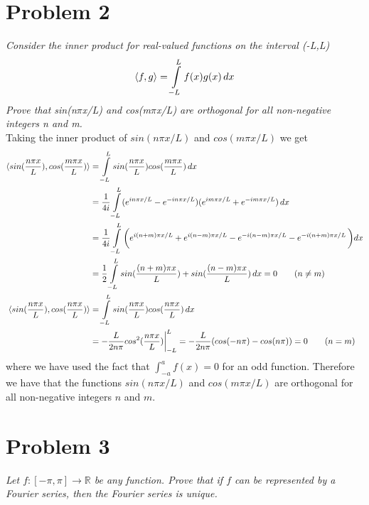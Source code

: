 \documentclass[12pt]{article}
\newcommand{\R}{\mathbb{R}}
\theoremstyle{remark}
\begin{document}
\newpage

\section*{Problem 2}

\textit{Consider the inner product for real-valued functions on the interval (-L,L)}
\begin{align}
	\braket{f,g} = \int\limits_{-L}^L f(x)g(x) \, dx
\end{align}
\textit{Prove that sin(n$\pi$x/L) and cos(m$\pi$x/L) are orthogonal for all non-negative integers n and m.} \\

Taking the inner product of $sin(n\pi x/L)$ and $cos(m\pi x/L)$ we get
\begin{align*}
	\braket{sin(\frac{n\pi x}{L}), cos(\frac{m\pi x}{L})} & = \int\limits_{-L}^L sin(\frac{n\pi x}{L})cos(\frac{m \pi x}{L}) \, dx \\
	& =
	\frac{1}{4i}\int\limits_{-L}^L (e^{in\pi x/L} - e^{-in\pi x/L})(e^{im\pi x/L} + e^{-im\pi x/L}) \, dx \\
	& = \frac{1}{4i}\int\limits_{-L}^{L}\bigg( e^{i(n+m)\pi x/L} + e^{i(n-m)\pi x/L} - e^{-i(n-m)\pi x/L} - e^{-i(n+m)\pi x/L} \, \bigg) dx \\
	& = \frac{1}{2}\int\limits_{-L}^L sin(\frac{(n+m)\pi x}{L}) + sin(\frac{(n-m)\pi x}{L}) \, dx = 0 \tag{$n \neq m$} \\
	\braket{sin(\frac{n\pi x}{L}), cos(\frac{n\pi x}{L})} & = 
	\int\limits_{-L}^L sin(\frac{n\pi x}{L})cos(\frac{n\pi x}{L}) \, dx \\ 
	& = -\frac{L}{2n\pi}cos^2(\frac{n\pi x}{L})\bigg\vert_{-L}^L = -\frac{L}{2n\pi}(cos(-n\pi) - cos(n\pi)) = 0 \tag{$n = m$}
\end{align*}
where we have used the fact that $\int_{-a}^a f(x) = 0$ for an odd function. Therefore we have that the functions $sin(n\pi x/L)$ and $cos(m\pi x/L)$ are orthogonal for all non-negative integers $n$ and $m$.

\newpage

\section*{Problem 3}

\textit{Let $f: [-\pi, \pi] \rightarrow \R$ be any function. Prove that if $f$ can be represented by a Fourier series, then the Fourier series is unique.} \\
\end{document}

